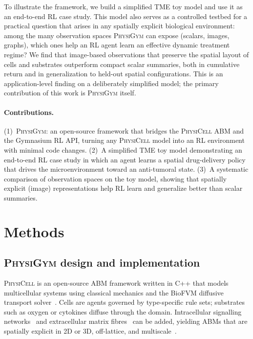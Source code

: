 \documentclass{article}
\newcommand{\physigym}{\textsc{PhysiGym}}
\newcommand{\physicell}{\textsc{PhysiCell}}
\begin{document}
To illustrate the framework, we build a simplified TME toy model and use it as
an end-to-end RL case study. This model also serves as a controlled testbed for
a practical question that arises in any spatially explicit biological
environment: among the many observation spaces \physigym{} can expose (scalars,
images, graphs), which ones help an RL agent learn an effective dynamic treatment
regime? We find that image-based observations that preserve the spatial layout of
cells and substrates outperform compact scalar summaries, both in cumulative
return and in generalization to held-out spatial configurations. This is an
application-level finding on a deliberately simplified model; the primary
contribution of this work is \physigym{} itself.

\paragraph{Contributions.}
(1)~\physigym{}: an open-source framework that bridges the \physicell{} ABM and
the Gymnasium RL API, turning any \physicell{} model into an RL environment with
minimal code changes.
(2)~A simplified TME toy model demonstrating an end-to-end RL case study in
which an agent learns a spatial drug-delivery policy that drives the
microenvironment toward an anti-tumoral state.
(3)~A systematic comparison of observation spaces on the toy model, showing
that spatially explicit (image) representations help RL learn and generalize
better than scalar summaries.

\section{Methods}
\subsection{\physigym{} design and implementation}
\label{sec:physigym}

\physicell{} is an open-source ABM framework written in C++ that models
multicellular systems using classical mechanics and the BioFVM diffusive
transport solver~\citep{ghaffarizadeh2018physicell, ghaffarizadeh2016biofvm}.
Cells are agents governed by type-specific rule sets; substrates such as oxygen
or cytokines diffuse through the domain. Intracellular signalling
networks~\citep{letort2018physiboss, ponce2023physiboss, ruscone2024physiboss}
and extracellular matrix fibres~\citep{noel2024physimess} can be added, yielding
ABMs that are spatially explicit in 2D or 3D, off-lattice, and
multiscale~\citep{metzcar2019review}.
\end{document}
